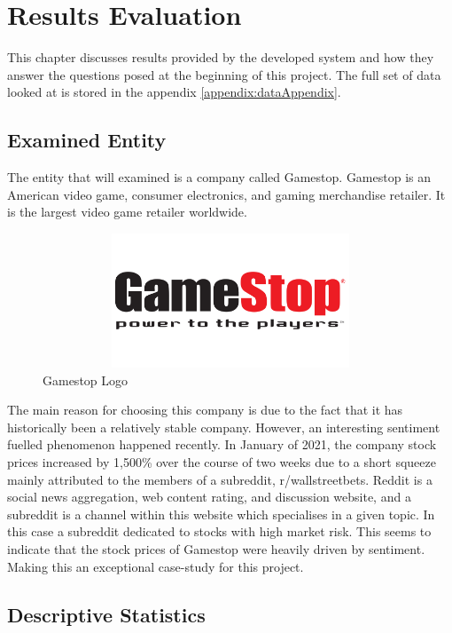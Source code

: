 
\chapter{Results Evaluation}

This chapter discusses results provided by the developed system and how they answer the questions posed at the beginning of this project. The full set of data looked at is stored in the appendix \ref{appendix:dataAppendix}.

\section{Examined Entity}

The entity that will examined is a company called Gamestop. Gamestop is an American video game, consumer electronics, and gaming merchandise retailer. It is the largest video game retailer worldwide.

\begin{figure}[h!]
    \centering
    \includegraphics[width=15cm,height=4cm,keepaspectratio]{resultsEvaluation/gamestop.png}
    \caption{Gamestop Logo}
    \label{fig:gamestop}
\end{figure}

The main reason for choosing this company is due to the fact that it has historically been a relatively stable company. However, an interesting sentiment fuelled phenomenon happened recently. In January of 2021, the company stock prices increased by 1,500\% over the course of two weeks due to a short squeeze mainly attributed to the members of a subreddit, r/wallstreetbets. Reddit is a social news aggregation, web content rating, and discussion website, and a subreddit is a channel within this website which specialises in a given topic. In this case a subreddit dedicated to stocks with high market risk. This seems to indicate that the stock prices of Gamestop were heavily driven by sentiment. Making this an exceptional case-study for this project.

\section{Descriptive Statistics}


